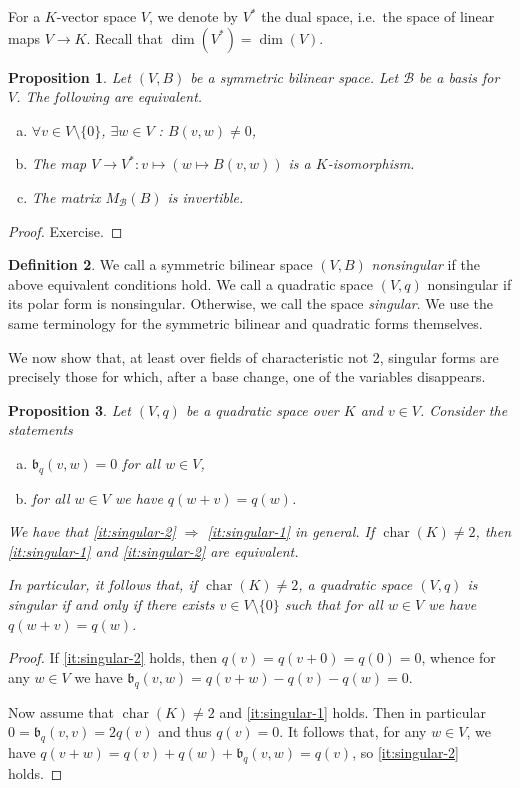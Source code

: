 \documentclass[12pt, leqno, british]{amsart}
\theoremstyle{definition}
\newtheorem{defi}{Definition}[subsection]
\theoremstyle{plain}
\newtheorem{prop}[defi]{Proposition}
\theoremstyle{remark}
\newcommand{\mc}{\mathcal}
\newcommand{\mf}{\mathfrak}
\DeclareMathOperator{\charac}{char}
\begin{document}
For a $K$-vector space $V$, we denote by $V^\ast$ the dual space, i.e.~the space of linear maps $V \to K$.
Recall that $\dim(V^\ast) = \dim(V)$.
\begin{prop}\label{P:nonsingular-characterisations}
Let $(V, B)$ be a symmetric bilinear space.
Let $\mc{B}$ be a basis for $V$.
The following are equivalent.
\begin{enumerate}[(a)]
\item $\forall v \in V \setminus \lbrace 0 \rbrace$, $\exists w \in V$ : $B(v, w) \neq 0$,
\item The map $V \to V^\ast : v \mapsto (w \mapsto B(v, w))$ is a $K$-isomorphism.
\item The matrix $M_\mc{B}(B)$ is invertible.
\end{enumerate}
\end{prop}
\begin{proof}
Exercise.
\end{proof}
\begin{defi}
We call a symmetric bilinear space $(V, B)$ \emph{nonsingular} if the above equivalent conditions hold.
We call a quadratic space $(V, q)$ nonsingular if its polar form is nonsingular.
Otherwise, we call the space \emph{singular}.
We use the same terminology for the symmetric bilinear and quadratic forms themselves.
\end{defi}
We now show that, at least over fields of characteristic not $2$, singular forms are precisely those for which, after a base change, one of the variables disappears.
\begin{prop}\label{P:nonsingular-polynomials}
Let $(V, q)$ be a quadratic space over $K$ and $v \in V$. Consider the statements
\begin{enumerate}[(a)]
\item\label{it:singular-1} $\mf{b}_q(v, w) = 0$ for all $w \in V$,
\item\label{it:singular-2} for all $w \in V$ we have $q(w + v) = q(w)$.
\end{enumerate}
We have that \eqref{it:singular-2} $\Rightarrow$ \eqref{it:singular-1} in general.
If $\charac(K) \neq 2$, then \eqref{it:singular-1} and \eqref{it:singular-2} are equivalent.

In particular, it follows that, if $\charac(K) \neq 2$, a quadratic space $(V, q)$ is singular if and only if there exists $v \in V \setminus \lbrace 0 \rbrace$ such that for all $w \in V$ we have $q(w+v) = q(w)$.
\end{prop}
\begin{proof}
If \eqref{it:singular-2} holds, then $q(v) = q(v + 0) = q(0) = 0$, whence for any $w \in V$ we have $\mf{b}_q(v, w) = q(v + w) - q(v) - q(w) = 0$. %

Now assume that $\charac(K) \neq 2$ and \eqref{it:singular-1} holds.
Then in particular $0 = \mf{b}_q(v, v) = 2q(v)$ and thus $q(v) = 0$.
It follows that, for any $w \in V$, we have $q(v + w) = q(v) + q(w) + \mf{b}_q(v, w) = q(v)$, so \eqref{it:singular-2} holds.
\end{proof}
\end{document}
